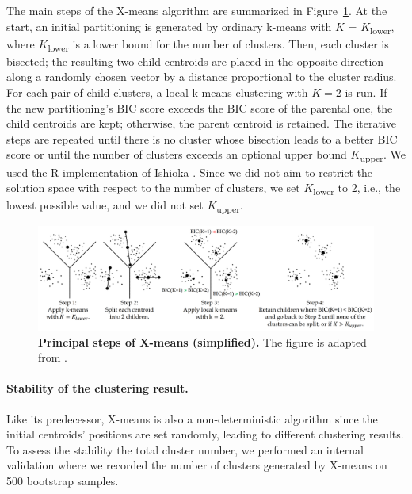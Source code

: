 \documentclass[
  oneside]{book}
\begin{document}
The main steps of the X-means algorithm are summarized in Figure~\ref{fig:05-xmeans}.
At the start, an initial partitioning is generated by ordinary k-means with \(K\) = \(K\)\textsubscript{lower}, where \(K\)\textsubscript{lower} is a lower bound for the number of clusters.
Then, each cluster is bisected; the resulting two child centroids are placed in the opposite direction along a randomly chosen vector by a distance proportional to the cluster radius.
For each pair of child clusters, a local k-means clustering with \(K=2\) is run.
If the new partitioning's BIC score exceeds the BIC score of the parental one, the child centroids are kept; otherwise, the parent centroid is retained.
The iterative steps are repeated until there is no cluster whose bisection leads to a better BIC score or until the number of clusters exceeds an optional upper bound \(K\)\textsubscript{upper}.
We used the R implementation of Ishioka \autocite{Ishioka:xmeansimplementation2005}.
Since we did not aim to restrict the solution space with respect to the number of clusters, we set \(K\)\textsubscript{lower} to 2, i.e., the lowest possible value, and we did not set \(K\)\textsubscript{upper}.



\begin{figure}[htb]

{\centering \includegraphics[width=1\linewidth]{figures/05-xmeans} 

}

\caption{\textbf{Principal steps of X-means (simplified).} The figure is adapted from \autocite{Pelleg:xmeans2000}.}\label{fig:05-xmeans}
\end{figure}

\paragraph*{Stability of the clustering result.}

Like its predecessor, X-means is also a non-deterministic algorithm since the initial centroids' positions are set randomly, leading to different clustering results.
To assess the stability the total cluster number, we performed an internal validation where we recorded the number of clusters generated by X-means on 500 bootstrap samples.
\end{document}
